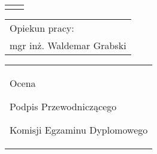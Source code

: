 \begin{titlepage}
{\begin{center}
	\vspace*{7\baselineskip}
	\hfill\mbox{}\par\vspace*{\baselineskip}\noindent
	\begin{tabular}[b]{@{}p{3cm}@{\ }l@{}}
	    {\large\hfill } & {\large }
	\end{tabular}
	\hfill
	\begin{tabular}[b]{@{}l@{}}
	Opiekun pracy: \\[\smallskipamount]
	{\large mgr inż. Waldemar Grabski}
	\end{tabular}\par
	\vspace*{4\baselineskip}
    \begin{tabular}{p{\textwidth}}
    \begin{flushleft}
	\begin{minipage}{7cm}
	Ocena \dotfill
	\par\vspace{1.6\baselineskip}
	\dotfill
	\par\noindent
	\centerline{\footnotesize Podpis Przewodniczącego} \par
	\centerline{\footnotesize Komisji Egzaminu Dyplomowego}\par
	\end{minipage}
    \end{flushleft}
    \end{tabular}
    \end{center}}


\end{titlepage}
